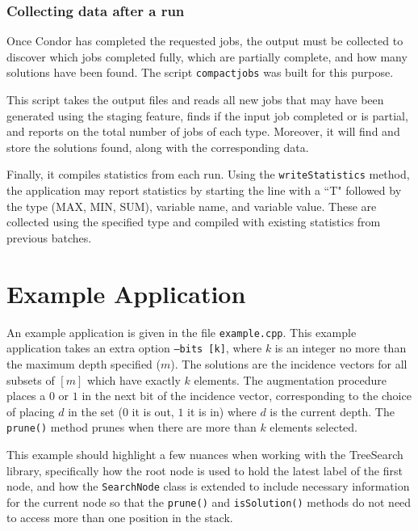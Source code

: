 \documentclass[11pt]{article}
\begin{document}
\subsubsection{Collecting data after a run}

Once Condor has completed the requested jobs, the output must be collected to 
	discover which jobs completed fully, which are partially complete,
	and how many solutions have been found.
The script \texttt{compactjobs} was built for this purpose.

This script takes the output files and reads all new jobs that may have been generated 
	using the staging feature, finds if the input job completed or is partial,
	and reports on the total number of jobs of each type.
Moreover, it will find and store the solutions found, along with the corresponding data.

Finally, it compiles statistics from each run.  
Using the \texttt{writeStatistics} method,
	the application may report statistics by starting the line with a ``T" followed by the
	type (MAX, MIN, SUM), variable name, and variable value.
These are collected using the specified type and compiled with existing statistics from previous batches.






\section{Example Application}
\label{sec:Example}

An example application is given in the file \texttt{example.cpp}. 
This example application takes an extra option \texttt{--bits [k]}, 
	where $k$ is an integer no more than the maximum depth specified ($m$).
The solutions are the incidence vectors for all subsets of $[m]$
	which have exactly $k$ elements.
The augmentation procedure places a $0$ or $1$ in the
	next bit of the incidence vector, corresponding to the 
	choice of placing $d$ in the set ($0$ it is out, $1$ it is in)
	where $d$ is the current depth.
The \texttt{prune()} method prunes when there are more than $k$ elements selected.

This example should highlight a few nuances when working with the TreeSearch library,
	specifically how the root node is used to hold the 
	latest label of the first node,
	and how the \texttt{SearchNode} class is extended to include 
	necessary information for the current node
	so that the \texttt{prune()} and \texttt{isSolution()} 
	methods do not need to access more than one position in the stack.
\end{document}
